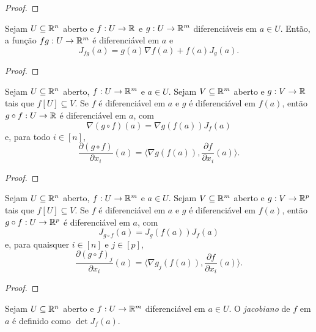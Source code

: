 \begin{proof}
    \blackproof
\end{proof}

\begin{proposition}
    Sejam $U \subseteq \mathbb{R}^n$ aberto e $f : U \to \mathbb{R}$ e $g : U \to \mathbb{R}^m$ diferenciáveis em $a \in U$. Então, a função $fg : U \to \mathbb{R}^m$ é diferenciável em $a$ e
        \[
            J_{fg}(a) = g(a) \nabla f(a) + f(a) J_g(a).
        \] 
\end{proposition}

\begin{proof}
    \blackproof
\end{proof}

\begin{theorem}
    Sejam $U \subseteq \mathbb{R}^n$ aberto, $f : U \to \mathbb{R}^m$ e $a \in U$. Sejam $V \subseteq \mathbb{R}^m$ aberto e $g : V \to \mathbb{R}$ tais que $f[U] \subseteq V$. Se $f$ é diferenciável em $a$ e $g$ é diferenciável em $f(a)$, então $g \circ f : U \to \mathbb{R}$ é diferenciável em $a$, com
        \[
            \nabla (g \circ f)(a) = \nabla g(f(a)) J_f(a)
        \]
    e, para todo $i \in [n]$,
        \[
            \dfrac{\partial (g \circ f)}{\partial x_i}(a) = \langle \nabla g(f(a)), \dfrac{\partial f}{\partial x_i}(a) \rangle.
        \]
\end{theorem}

\begin{proof}
    \blackproof
\end{proof}

\begin{theorem}
    Sejam $U \subseteq \mathbb{R}^n$ aberto, $f : U \to \mathbb{R}^m$ e $a \in U$. Sejam $V \subseteq \mathbb{R}^m$ aberto e $g : V \to \mathbb{R}^p$ tais que $f[U] \subseteq V$. Se $f$ é diferenciável em $a$ e $g$ é diferenciável em $f(a)$, então $g \circ f : U \to \mathbb{R}^p$ é diferenciável em $a$, com
        \[
            J_{g \circ f}(a) = J_g(f(a)) J_f(a)
        \]
    e, para quaisquer $i \in [n]$ e $j \in [p]$,
        \[
            \dfrac{\partial (g \circ f)_j}{\partial x_i}(a) = \langle \nabla g_j(f(a)), \dfrac{\partial f}{\partial x_i}(a) \rangle.
        \]
\end{theorem}

\begin{proof}
    \blackproof
\end{proof}

\begin{definition}
    Sejam $U \subseteq \mathbb{R}^n$ aberto e $f : U \to \mathbb{R}^m$ diferenciável em $a \in U$. O \emph{jacobiano} de $f$ em $a$ é definido como $\det J_f(a)$.
\end{definition}

